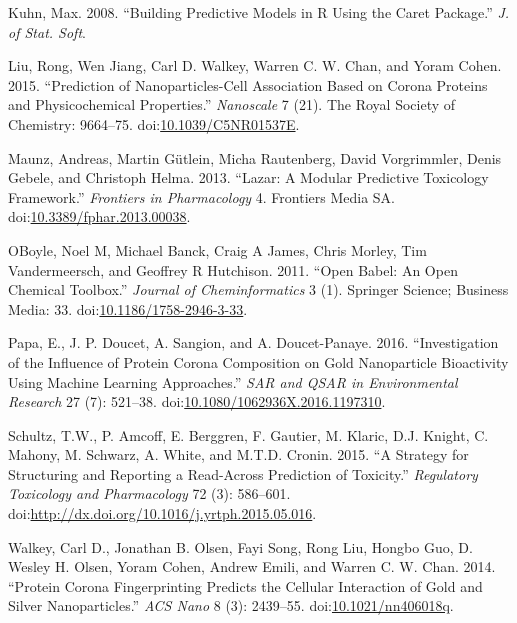 \documentclass[utf8]{frontiersHLTH} %
\begin{document}
\hypertarget{ref-Kuhn08}{}
Kuhn, Max. 2008. ``Building Predictive Models in R Using the Caret
Package.'' \emph{J. of Stat. Soft}.

\hypertarget{ref-Liu15}{}
Liu, Rong, Wen Jiang, Carl D. Walkey, Warren C. W. Chan, and Yoram
Cohen. 2015. ``Prediction of Nanoparticles-Cell Association Based on
Corona Proteins and Physicochemical Properties.'' \emph{Nanoscale} 7
(21). The Royal Society of Chemistry: 9664--75.
doi:\href{https://doi.org/10.1039/C5NR01537E}{10.1039/C5NR01537E}.

\hypertarget{ref-Maunz2013}{}
Maunz, Andreas, Martin Gütlein, Micha Rautenberg, David Vorgrimmler,
Denis Gebele, and Christoph Helma. 2013. ``Lazar: A Modular Predictive
Toxicology Framework.'' \emph{Frontiers in Pharmacology} 4. Frontiers
Media SA.
doi:\href{https://doi.org/10.3389/fphar.2013.00038}{10.3389/fphar.2013.00038}.

\hypertarget{ref-OBoyle2011}{}
OBoyle, Noel M, Michael Banck, Craig A James, Chris Morley, Tim
Vandermeersch, and Geoffrey R Hutchison. 2011. ``Open Babel: An Open
Chemical Toolbox.'' \emph{Journal of Cheminformatics} 3 (1). Springer
Science; Business Media: 33.
doi:\href{https://doi.org/10.1186/1758-2946-3-33}{10.1186/1758-2946-3-33}.

\hypertarget{ref-Papa16}{}
Papa, E., J. P. Doucet, A. Sangion, and A. Doucet-Panaye. 2016.
``Investigation of the Influence of Protein Corona Composition on Gold
Nanoparticle Bioactivity Using Machine Learning Approaches.'' \emph{SAR
and QSAR in Environmental Research} 27 (7): 521--38.
doi:\href{https://doi.org/10.1080/1062936X.2016.1197310}{10.1080/1062936X.2016.1197310}.

\hypertarget{ref-Schultz15}{}
Schultz, T.W., P. Amcoff, E. Berggren, F. Gautier, M. Klaric, D.J.
Knight, C. Mahony, M. Schwarz, A. White, and M.T.D. Cronin. 2015. ``A
Strategy for Structuring and Reporting a Read-Across Prediction of
Toxicity.'' \emph{Regulatory Toxicology and Pharmacology} 72 (3):
586--601.
doi:\href{https://doi.org/http://dx.doi.org/10.1016/j.yrtph.2015.05.016}{http://dx.doi.org/10.1016/j.yrtph.2015.05.016}.

\hypertarget{ref-Walkey14}{}
Walkey, Carl D., Jonathan B. Olsen, Fayi Song, Rong Liu, Hongbo Guo, D.
Wesley H. Olsen, Yoram Cohen, Andrew Emili, and Warren C. W. Chan. 2014.
``Protein Corona Fingerprinting Predicts the Cellular Interaction of
Gold and Silver Nanoparticles.'' \emph{ACS Nano} 8 (3): 2439--55.
doi:\href{https://doi.org/10.1021/nn406018q}{10.1021/nn406018q}.
\end{document}
